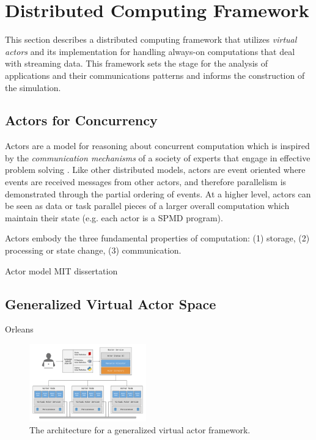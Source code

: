 \documentclass[conference,twocolumn,11pt]{IEEEtran}
\begin{document}
\section{Distributed Computing Framework}

This section describes a distributed computing framework that utilizes \textit{virtual actors} and its implementation for handling always-on computations that deal with streaming data. This framework sets the stage for the analysis of applications and their communications patterns and informs the construction of the simulation.

\subsection{Actors for Concurrency}

Actors are a model for reasoning about concurrent computation which is inspired by the \textit{communication mechanisms} of a society of experts that engage in effective problem solving \cite{hewitt_viewing_1977}.  Like other distributed models, actors are event oriented where events are received messages from other actors, and therefore parallelism is demonstrated through the partial ordering of events. At a higher level, actors can be seen as data or task parallel pieces of a larger overall computation which maintain their state (e.g. each actor is a SPMD program).


Actors embody the three fundamental properties of computation: (1) storage, (2) processing or state change, (3) communication.

Actor model MIT dissertation \cite{hewitt_viewing_1977, agha_actors:_1985}


\subsection{Generalized Virtual Actor Space}


Orleans \cite{bernstein_orleans:_????}

\begin{figure}[!h]
    \centering
    \includegraphics[width=0.45\textwidth]{architecture}
    \caption{The architecture for a generalized virtual actor framework.}
    \label{fig:architecture}
\end{figure}
\end{document}
